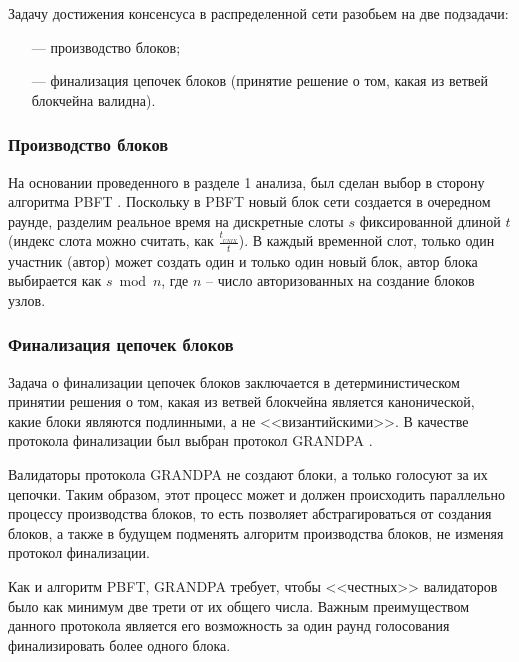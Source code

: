 Задачу достижения консенсуса в распределенной сети разобьем на две подзадачи:
\begin{itemize}[leftmargin=1.6\parindent]
	\item[---] производство блоков;
	\item[---] финализация цепочек блоков (принятие решение о том, какая из ветвей блокчейна валидна).
\end{itemize}


\subsubsection{Производство блоков}

На основании проведенного в разделе 1 анализа, был сделан выбор в сторону алгоритма PBFT \cite{pbft}. Поскольку в PBFT новый блок сети создается в очередном раунде, разделим реальное время на дискретные слоты $s$ фиксированной длиной $t$ (индекс слота можно считать, как $\frac{t_{_{UNIX}}}{t}$). В каждый временной слот, только один участник (автор) может создать один и только один новый блок, автор блока выбирается как $s \bmod n$, где $n$ -- число авторизованных на создание блоков узлов.


\subsubsection{Финализация цепочек блоков}


Задача о финализации цепочек блоков заключается в детерминистическом принятии решения о том, какая из ветвей блокчейна является канонической, какие блоки являются подлинными, а не <<византийскими>>. В качестве протокола финализации был выбран протокол GRANDPA \cite{finality}.

Валидаторы протокола GRANDPA не создают блоки, а только голосуют за их цепочки. Таким образом, этот процесс может и должен происходить параллельно процессу производства блоков, то есть позволяет абстрагироваться от создания блоков, а также в будущем подменять алгоритм производства блоков, не изменяя протокол финализации.

Как и алгоритм PBFT, GRANDPA требует, чтобы <<честных>> валидаторов было как минимум две трети от их общего числа. Важным преимуществом данного протокола является его возможность за один раунд голосования финализировать более одного блока.


